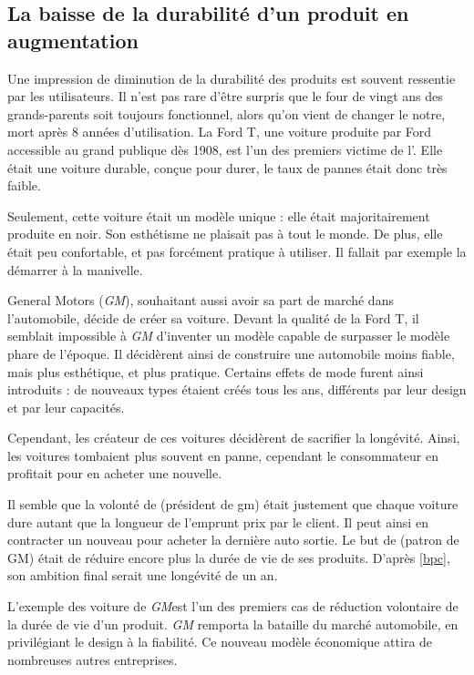 \subsection{La baisse de la durabilité d'un produit en augmentation}

Une impression de diminution de la durabilité des produits est souvent ressentie par les utilisateurs.  Il n'est pas rare d'être surpris que le four de vingt ans des grands-parents soit toujours fonctionnel, alors qu'on vient de changer le notre, mort après 8 années d'utilisation. 
\smallbreak
La Ford T, une voiture produite par Ford accessible au grand publique dès 1908, est l'un des premiers victime de l'\op. Elle était une voiture durable, conçue pour durer, le taux de pannes était donc très faible.   

Seulement, cette voiture était un modèle unique : elle était majoritairement produite en noir. Son esthétisme ne plaisait pas à tout le monde. De plus, elle était peu confortable, et pas forcément pratique à utiliser. Il fallait par exemple la démarrer à la manivelle. 

General Motors (\textit{GM}), souhaitant aussi avoir sa part de marché dans l'automobile, décide de créer sa voiture. Devant la qualité de la Ford T, il semblait impossible à \textit{GM} d'inventer un modèle capable de surpasser le modèle phare de l'époque. Il décidèrent ainsi de construire une automobile moins fiable, mais plus esthétique, et plus pratique. Certains effets de mode furent ainsi introduits : de nouveaux types étaient créés tous les ans, différents par leur design et par leur capacités.

Cependant, les créateur de ces voitures décidèrent de sacrifier la longévité. Ainsi, les voitures tombaient plus souvent en panne, cependant le consommateur en profitait pour en acheter une nouvelle. 

Il semble que la volonté de (président de gm) était justement que chaque voiture dure autant que la longueur de l'emprunt prix par le client. Il peut ainsi en contracter un nouveau pour acheter la dernière auto sortie. Le but de (patron de GM) était de réduire encore plus la durée de vie de ses produits. D'après \ref{bpc}, son ambition final serait une longévité de un an. 

\smallbreak
L'exemple des voiture de \textit{GM}est l'un des premiers cas de réduction volontaire de la durée de vie d'un produit. \textit{GM} remporta la bataille du marché automobile, en privilégiant le design à la fiabilité. Ce nouveau modèle économique attira de nombreuses autres entreprises. 

